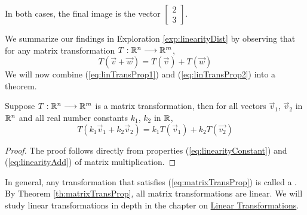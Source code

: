 \documentclass{ximera}
\begin{document}
\begin{exploration}
\begin{center}
  \end{center}
  In both cases, the final image is the vector $\begin{bmatrix}2\\3\end{bmatrix}$.
\end{exploration}

We summarize our findings in Exploration \ref{exp:linearityDist} by observing that for any matrix transformation $T:\mathbb{R}^n\longrightarrow \mathbb{R}^m$, 
\begin{equation}\label{eq:linTransProp2}
T(\vec{v}+\vec{w})=T(\vec{v})+T(\vec{w})
\end{equation}
We will now combine (\ref{eq:linTransProp1}) and (\ref{eq:linTransProp2}) into a theorem.  
\begin{theorem}\label{th:matrixTransProp}
    Suppose $T:\mathbb{R}^n\longrightarrow\mathbb{R}^m$ is a matrix transformation, then for all vectors $\vec{v}_1$, $\vec{v}_2$ in $\mathbb{R}^n$ and all real number constants $k_1$, $k_2$ in $\mathbb{R}$,
    \begin{equation}\label{eq:matrixTransProp} T(k_1\vec{v}_1+k_2\vec{v}_2)=k_1T(\vec{v}_1)+k_2T(\vec{v_2})
    \end{equation}
\end{theorem}
\begin{proof}
    The proof follows directly from properties (\ref{eq:linearityConstant}) and (\ref{eq:linearityAdd}) of matrix multiplication.
\end{proof}

In general, any transformation that satisfies (\ref{eq:matrixTransProp}) is called a .  By Theorem \ref{th:matrixTransProp}, all matrix transformations are linear.
We will study linear transformations in depth in the chapter on \href{https://ximera.osu.edu/oerlinalg/LinearAlgebra/XLAChapter_linTrans/main}{Linear Transformations}.
\end{document}
